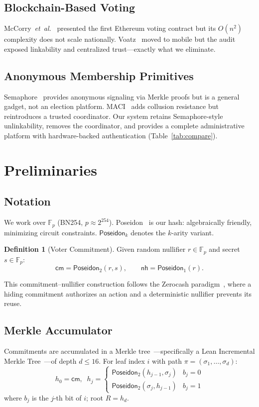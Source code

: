 \documentclass[conference]{IEEEtran}
\theoremstyle{definition}
\newtheorem{definition}{Definition}
\theoremstyle{plain}
\newcommand{\Poseidon}{\mathsf{Poseidon}}
\newcommand{\nullhash}{\mathsf{nh}}
\newcommand{\commit}{\mathsf{cm}}
\newcommand{\field}{\mathbb{F}_p}
\begin{document}
\subsection{Blockchain-Based Voting}
McCorry~\emph{et~al.}~\cite{mccorry2017} presented the first Ethereum voting contract but its $O(n^2)$ complexity does not scale nationally. Voatz~\cite{voatz2018} moved to mobile but the audit~\cite{voatz_audit2020} exposed linkability and centralized trust---exactly what we eliminate.

\subsection{Anonymous Membership Primitives}
Semaphore~\cite{semaphore2020} provides anonymous signaling via Merkle proofs but is a general gadget, not an election platform. MACI~\cite{maci2020} adds collusion resistance but reintroduces a trusted coordinator. Our system retains Semaphore-style unlinkability, removes the coordinator, and provides a complete administrative platform with hardware-backed authentication (Table~\ref{tab:compare}).

\section{Preliminaries}

\subsection{Notation}
We work over $\field$ (BN254, $p\approx2^{254}$). Poseidon~\cite{poseidon2021} is our hash: algebraically friendly, minimizing circuit constraints. $\Poseidon_k$ denotes the $k$-arity variant.

\begin{definition}[Voter Commitment]
Given random nullifier $r\in\field$ and secret $s\in\field$:
\begin{equation}
\commit = \Poseidon_2(r,s),\qquad \nullhash = \Poseidon_1(r).
\label{eq:commit}
\end{equation}
\end{definition}
This commitment--nullifier construction follows the Zerocash paradigm~\cite{zerocash2014}, where a hiding commitment authorizes an action and a deterministic nullifier prevents its reuse.

\subsection{Merkle Accumulator}
Commitments are accumulated in a Merkle tree~\cite{merkle1987}---specifically a Lean Incremental Merkle Tree~\cite{leanIMT}---of depth $d\le16$. For leaf index $i$ with path $\pi=(\sigma_1,\ldots,\sigma_d)$:
\begin{equation}
h_0\!=\!\commit,\;\;
h_j\!=\!\begin{cases}
\Poseidon_2(h_{j-1},\sigma_j) & b_j=0\\
\Poseidon_2(\sigma_j,h_{j-1}) & b_j=1
\end{cases}
\label{eq:merkle}
\end{equation}
where $b_j$ is the $j$-th bit of $i$; root $R=h_d$.
\end{document}
